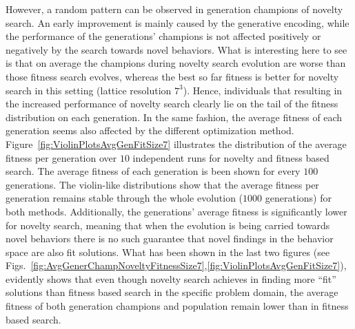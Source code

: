 However, a random pattern can be observed in generation champions of novelty search. An early improvement is mainly caused by the generative encoding, while the performance of the generations' champions is not affected positively or negatively by the search towards novel behaviors. What is interesting here to see is that on average the champions during novelty search evolution are worse than those fitness search evolves, whereas the best so far fitness is better for novelty search in this setting (lattice resolution $7^3$). Hence, individuals that resulting in the increased performance of novelty search clearly lie on the tail of the fitness distribution on each generation. In the same fashion, the average fitness of each generation seems also affected by the different optimization method. Figure~\ref{fig:ViolinPlotsAvgGenFitSize7} illustrates the distribution of the average fitness per generation over $10$ independent runs for novelty and fitness based search. The average fitness of each generation is been shown for every $100$ generations. The violin-like distributions show that the average fitness per generation remains stable through the whole evolution ($1000$ generations) for both methods. Additionally, the generations' average fitness is significantly lower for novelty search, meaning that when the evolution is being carried towards novel behaviors there is no such guarantee that novel findings in the behavior space are also  fit solutions. What has been shown in the last two figures (see Figs.~\ref{fig:AvgGenerChampNoveltyFitnessSize7},\ref{fig:ViolinPlotsAvgGenFitSize7}), evidently shows that even though novelty search achieves in finding more ``fit'' solutions than fitness based search in the specific problem domain, the average fitness of both generation champions and population remain lower than in fitness based search.


